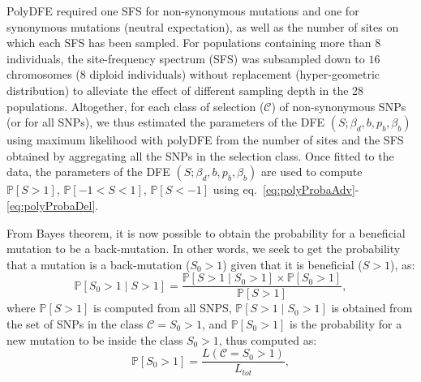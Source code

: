\documentclass{article}
\newcommand{\proba}{\mathbb{P}}
\newcommand{\Sphy}{S_{0}}
\newcommand{\Sphyclass}{\mathcal{C}}
\newcommand{\divAdv}{ \Sphy > 1}
\newcommand{\given}{\mid}
\newcommand{\Spop}{S}
\newcommand{\polyDel}{\Spop < -1}
\newcommand{\polyNeutral}{-1 < \Spop < 1}
\newcommand{\polyAdv}{ \Spop > 1}
\newcommand{\PpolyDel}{\proba \left[ \polyDel \right]}
\newcommand{\PpolyNeutral}{\proba \left[ \polyNeutral \right]}
\newcommand{\PpolyAdv}{\proba \left[ \polyAdv \right]}
\newcommand{\AdvMean}{\beta_b}
\newcommand{\DelMean}{\beta_d}
\begin{document}
    PolyDFE required one SFS for non-synonymous mutations and one for synonymous mutations (neutral expectation), as well as the number of sites on which each SFS has been sampled.
    For populations containing more than $8$ individuals, the site-frequency spectrum (SFS) was subsampled down to $16$ chromosomes ($8$ diploid individuals) without replacement (hyper-geometric distribution) to alleviate the effect of different sampling depth in the 28 populations.
    Altogether, for each class of selection ($\Sphyclass$) of non-synonymous SNPs (or for all SNPs), we thus estimated the parameters of the DFE $\left( \Spop; \DelMean , b, p_b, \AdvMean \right)$ using maximum likelihood with polyDFE from the number of sites and the SFS obtained by aggregating all the SNPs in the selection class.
    Once fitted to the data, the parameters of the DFE $\left( \Spop; \DelMean , b, p_b, \AdvMean \right)$ are used to compute $\PpolyAdv$, $\PpolyNeutral$, $\PpolyDel$ using eq.~\ref{eq:polyProbaAdv}-\ref{eq:polyProbaDel}.

    From Bayes theorem, it is now possible to obtain the probability for a beneficial mutation to be a back-mutation.
    In other words, we seek to get the probability that a mutation is a back-mutation ($\divAdv$) given that it is beneficial ($\polyAdv$), as:
    \begin{equation}
        \proba \left[\divAdv \given \polyAdv\right] = \frac{\proba \left[\polyAdv \given \divAdv\right] \times \proba\left[\divAdv\right]}{\PpolyAdv},
        \label{eq:bayes}
    \end{equation}
    where $\PpolyAdv$ is computed from all SNPS, $\proba \left[\polyAdv \given \divAdv\right]$ is obtained from the set of SNPs in the class $\Sphyclass = \divAdv$, and $\proba\left[\divAdv\right]$ is the probability for a new mutation to be inside the class $\divAdv$, thus computed as:
    \begin{equation}
        \proba\left[\divAdv\right] = \frac{L\left( \Sphyclass = \divAdv \right)}{L_{tot}},
        \label{eq:proba-dfe-mutsel}
    \end{equation}

    \printbibliography
\end{document}
